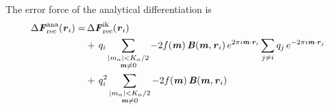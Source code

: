 \documentclass[aps,pre,preprint]{revtex4}
\renewcommand{\v}[1]{\textbf{\textit{#1}}}
\begin{document}
The error force of the analytical differentiation is 
\begin{align}\nonumber
  \Delta\v F_{\textrm{rec}}^{\textrm{ana}}(\v r_i)
  =&\,
  \Delta\v F_{\textrm{rec}}^{\textrm{ik}}(\v r_i)\\\nonumber
  & +\,
  q_i
  \sum_{
    \begin{subarray}{c}
      \vert m_{\alpha}\vert < K_\alpha/2\\
      \v m\neq 0
    \end{subarray}}
  -2f(\v m)\,
  \v B(\v m, \v r_i)\,e^{2\pi i\v m\cdot \v r_i}
  \sum_{j\neq i}q_j\,
  e^{-2\pi i\v m\cdot\v r_j} \\\label{eqn:ana.error.force}
  & +\,
  q^2_i
  \sum_{
    \begin{subarray}{c}
      \vert m_{\alpha}\vert < K_\alpha/2\\
      \v m\neq 0
    \end{subarray}}
  -2f(\v m)\,\v B(\v m, \v r_i) 
\end{align}
\end{document}
